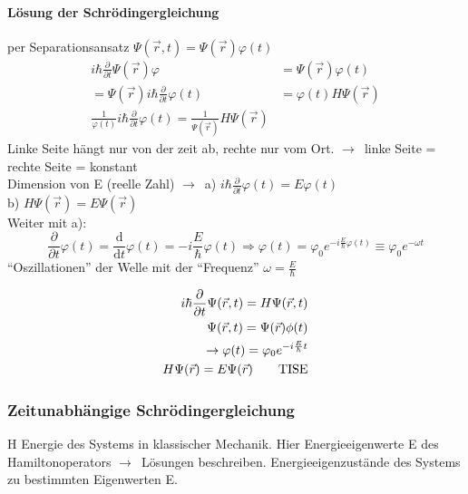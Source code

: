 \documentclass[oneside]{book}
\theoremstyle{definition}
\newcommand{\conseq}{$\rightarrow$~}
\renewcommand{\d}{\mathrm d}
\newcommand{\dd}[1]{\frac{\d}{\d #1}}
\newcommand{\fpartial}[1]{\frac{\partial}{\partial #1}}
\newcommand{\vp}{\varphi}
\begin{document}
\paragraph{Lösung der Schrödingergleichung} per Separationsansatz $\Psi(\vec{r}, t) = \Psi(\vec{r}) \vp(t)$
\begin{align*}
	i \hbar \fpartial{t} \Psi(\vec{r}) \vp &= \Psi(\vec{r}) \vp(t)\\
	= \Psi(\vec{r}) i \hbar \fpartial{t} \vp(t) &= \vp(t) H \Psi(\vec{r})\\
	\frac{1}{\vp(t)} i \hbar \fpartial{t} \vp(t) = \frac{1}{\Psi(\vec{r})} H \Psi(\vec{r})
\end{align*}
Linke Seite hängt nur von der zeit ab, rechte nur vom Ort. \conseq linke Seite = rechte Seite = konstant\\
Dimension von E (reelle Zahl)
\conseq a) $i \hbar \fpartial{t} \vp(t) = E \vp(t)$\\
b) $H \Psi(\vec{r}) = E \Psi(\vec{r})$\\
Weiter mit a):
$$\fpartial{t} \vp(t) = \dd{t} \vp(t) = - i \frac{E}{\hbar} \vp(t) \Rightarrow \vp(t) = \vp_0 e^{-i\frac{E}{\hbar} \vp(t)} \equiv \vp_0 e^{- \omega t}$$
"`Oszillationen"' der Welle mit der "`Frequenz"' $\omega = \frac{E}{\hbar}$

\begin{align*}
i \hbar \fpartial{t} \Psi(\vec{r}, t) = H \Psi(\vec{r}, t)\\
\Psi(\vec{r}, t) = \Psi(\vec{r}) \phi(t)\\
\rightarrow \vp(t) = \vp_0 e^{-i\frac{E}{\hbar}t}\\
H\Psi(\vec{r}) = E \Psi(\vec{r}) \text{\qquad TISE}
\end{align*}
\subsubsection{Zeitunabhängige Schrödingergleichung}
H Energie des Systems in klassischer Mechanik. Hier Energieeigenwerte E des Hamiltonoperators \conseq Lösungen beschreiben. Energieeigenzustände des Systems zu bestimmten Eigenwerten E.
\end{document}
